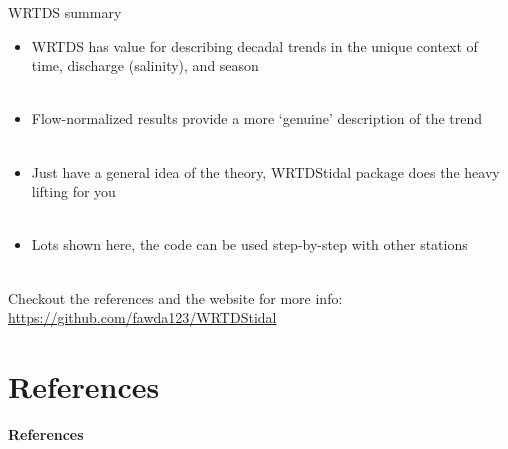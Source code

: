 \documentclass[xcolor=dvipsnames,serif]{beamer}\usepackage[]{graphicx}\usepackage[]{color}
\newcommand{\Bigtxt}[1]{\textbf{\textit{#1}}}
\begin{document}
\begin{frame}{WRTDS summary}{}
\begin{itemize}
\item<1-> WRTDS has value for describing decadal trends in the unique context of time, discharge (salinity), and season \\~\\
\item<2-> Flow-normalized results provide a more `genuine' description of the trend \\~\\
\item<3-> Just have a general idea of the theory, WRTDStidal package does the heavy lifting for you \\~\\
\item<4-> Lots shown here, the code can be used step-by-step with other stations \\~\\
\end{itemize}
Checkout the references and the website for more info: \href{https://github.com/fawda123/WRTDStidal}{https://github.com/fawda123/WRTDStidal}
\end{frame}


\section{References}
\begin{frame}[t]{\textbf{References}}
\tiny
{}


\end{frame}
\end{document}
